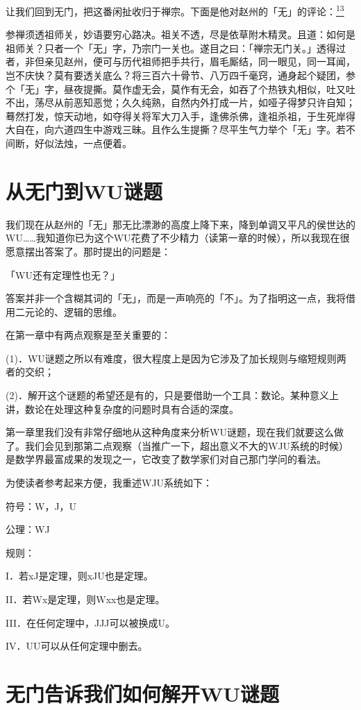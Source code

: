 \documentclass[
  12pt,
  twoside,
  openright,
  oldfontcommands,
]{memoir}
\begin{document}
让我们回到无门，把这番闲扯收归于禅宗。下面是他对赵州的「无」的评论：\hyperref[fn:Chapter09-13]{\textsuperscript{13}}

参禅须透祖师关，妙语要穷心路决。祖关不透，尽是依草附木精灵。且道：如何是祖师关？只者一个「无」字，乃宗门一关也。遂目之曰：「禅宗无门关。」透得过者，非但亲见赵州，便可与历代祖师把手共行，眉毛厮结，同一眼见，同一耳闻，岂不庆快？莫有要透关底么？将三百六十骨节、八万四千毫窍，通身起个疑团，参个「无」字，昼夜提撕。莫作虚无会，莫作有无会，如吞了个热铁丸相似，吐又吐不出，荡尽从前恶知恶觉；久久纯熟，自然内外打成一片，如哑子得梦只许自知；蓦然打发，惊天动地，如夺得关将军大刀入手，逢佛杀佛，逢祖杀祖，于生死岸得大自在，向六道四生中游戏三昧。且作么生提撕？尽平生气力举个「无」字。若不间断，好似法烛，一点便着。

\section{从无门到WU谜题}

我们现在从赵州的「无」那无比漂渺的高度上降下来，降到单调又平凡的侯世达的WU\ldots\ldots 我知道你已为这个WU花费了不少精力（读第一章的时候），所以我现在很愿意摆出答案了。那时提出的问题是：

「WU还有定理性也无？」

答案并非一个含糊其词的「无」，而是一声响亮的「不」。为了指明这一点，我将借用二元论的、逻辑的思维。

在第一章中有两点观察是至关重要的：

(1)．WU谜题之所以有难度，很大程度上是因为它涉及了加长规则与缩短规则两者的交织；

(2)．解开这个谜题的希望还是有的，只是要借助一个工具：数论。某种意义上讲，数论在处理这种复杂度的问题时具有合适的深度。

第一章里我们没有非常仔细地从这种角度来分析WU谜题，现在我们就要这么做了。我们会见到那第二点观察（当推广一下，超出意义不大的WJU系统的时候）是数学界最富成果的发现之一，它改变了数学家们对自己那门学问的看法。

为使读者参考起来方便，我重述WJU系统如下：

符号：W，J，U

公理：WJ

规则：

I．若xJ是定理，则xJU也是定理。

II．若Wx是定理，则Wxx也是定理。

III．在任何定理中，JJJ可以被换成U。

IV．UU可以从任何定理中删去。

\section{无门告诉我们如何解开WU谜题}
\end{document}
